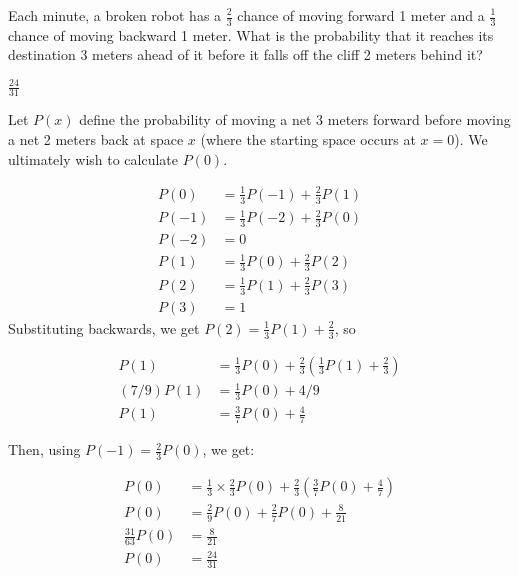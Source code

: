 \documentclass[11pt]{article}
\begin{document}
\begin{problem}
Each minute, a broken robot has a $\frac{2}{3}$ chance of moving forward 1 meter and a $\frac{1}{3}$ chance of moving backward 1 meter. What is the probability that it reaches its destination 3 meters ahead of it before it falls off the cliff 2 meters behind it?
\end{problem}
\begin{answer}
$\boxed{\frac{24}{31}}$
\end{answer}
\begin{solution}
Let $P(x)$ define the probability of moving a net 3 meters forward before moving a net 2 meters back at space $x$ (where the starting space occurs at $x = 0$). We ultimately wish to calculate $P(0)$.

\begin{align*}
P(0) &= \frac{1}{3}P(-1) + \frac{2}{3}P(1)\\
P(-1) &= \frac{1}{3}P(-2) + \frac{2}{3}P(0)\\
P(-2) &= 0\\
P(1) &= \frac{1}{3}P(0) + \frac{2}{3}P(2)\\
P(2) &= \frac{1}{3}P(1) + \frac{2}{3}P(3)\\
P(3) &= 1
\end{align*}
Substituting backwards, we get $P(2) = \frac{1}{3}P(1) + \frac{2}{3}$, so

\begin{align*}
P(1) &= \frac{1}{3}P(0) + \frac{2}{3}(\frac{1}{3}P(1) + \frac{2}{3})\\
(7/9)P(1) &= \frac{1}{3}P(0) + 4/9\\
P(1) &= \frac{3}{7}P(0) + \frac{4}{7}
\end{align*}

Then, using $P(-1) = \frac{2}{3}P(0)$, we get:

\begin{align*}
P(0) &= \frac{1}{3}\times\frac{2}{3}P(0) + \frac{2}{3}(\frac{3}{7}P(0) + \frac{4}{7})\\
P(0) &= \frac{2}{9}P(0) + \frac{2}{7}P(0) + \frac{8}{21}\\
\frac{31}{63}P(0) &= \frac{8}{21}\\
P(0) &= \boxed{\frac{24}{31}}
\end{align*}

\end{solution}
\end{document}
